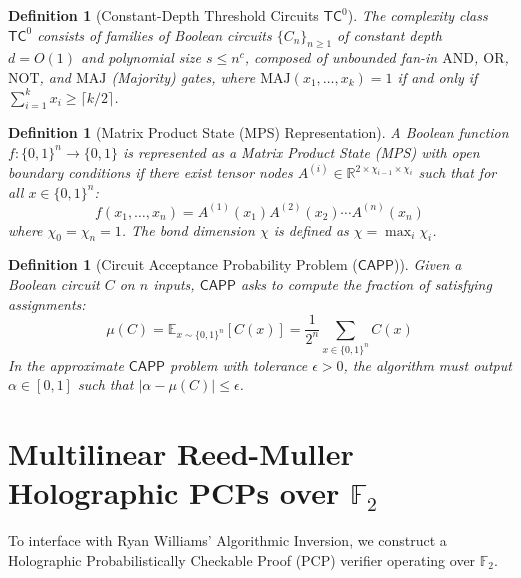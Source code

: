 \documentclass[11pt,letterpaper]{article}
\newtheorem{definition}[theorem]{Definition}
\newcommand{\TC}{\mathsf{TC}}
\newcommand{\CAPP}{\mathsf{CAPP}}
\newcommand{\E}{\mathbb{E}}
\newcommand{\F}{\mathbb{F}}
\newcommand{\R}{\mathbb{R}}
\newcommand{\eps}{\epsilon}
\begin{document}
\begin{definition}[Constant-Depth Threshold Circuits $\TC^0$]
The complexity class $\TC^0$ consists of families of Boolean circuits $\{C_n\}_{n \ge 1}$ of constant depth $d = O(1)$ and polynomial size $s \le n^c$, composed of unbounded fan-in $\mathrm{AND}$, $\mathrm{OR}$, $\mathrm{NOT}$, and $\mathrm{MAJ}$ (Majority) gates, where $\mathrm{MAJ}(x_1, \dots, x_k) = 1$ if and only if $\sum_{i=1}^k x_i \ge \lceil k/2 \rceil$.
\end{definition}

\begin{definition}[Matrix Product State (MPS) Representation]
A Boolean function $f: \{0,1\}^n \to \{0,1\}$ is represented as a Matrix Product State (MPS) with open boundary conditions if there exist tensor nodes $A^{(i)} \in \R^{2 \times \chi_{i-1} \times \chi_i}$ such that for all $x \in \{0,1\}^n$:
\[
f(x_1, \dots, x_n) = A^{(1)}(x_1) A^{(2)}(x_2) \cdots A^{(n)}(x_n)
\]
where $\chi_0 = \chi_n = 1$. The bond dimension $\chi$ is defined as $\chi = \max_i \chi_i$.
\end{definition}

\begin{definition}[Circuit Acceptance Probability Problem ($\CAPP$)]
Given a Boolean circuit $C$ on $n$ inputs, $\CAPP$ asks to compute the fraction of satisfying assignments:
\[
\mu(C) = \E_{x \sim \{0,1\}^n}[C(x)] = \frac{1}{2^n} \sum_{x \in \{0,1\}^n} C(x)
\]
In the approximate $\CAPP$ problem with tolerance $\eps > 0$, the algorithm must output $\alpha \in [0,1]$ such that $|\alpha - \mu(C)| \le \eps$.
\end{definition}

\section{Multilinear Reed-Muller Holographic PCPs over $\mathbb{F}_2$}

To interface with Ryan Williams' Algorithmic Inversion, we construct a Holographic Probabilistically Checkable Proof (PCP) verifier operating over $\F_2$.
\end{document}
